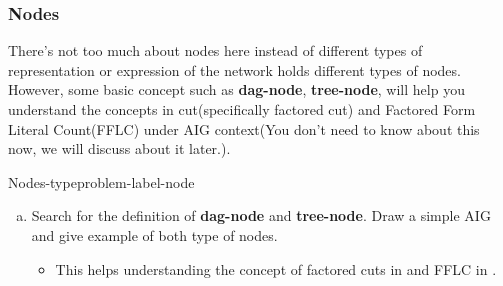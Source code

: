 \documentclass[main.tex]{subfiles}
\begin{document}
\subsubsection{Nodes}
There's not too much about nodes here instead of different types of representation or expression of the network holds different types of nodes. However, some basic concept such as \textbf{dag-node}, \textbf{tree-node}, will help you understand the concepts in cut(specifically factored cut) and Factored Form Literal Count(FFLC) under AIG context(You don't need to know about this now, we will discuss about it later.).
\begin{problem}{Nodes-type}{problem-label-node}
\begin{enumerate}[(a)]
    \item Search for the definition of \textbf{dag-node} and \textbf{tree-node}. Draw a simple AIG and give example of both type of nodes.
    \begin{itemize}
        \item This helps understanding the concept of factored cuts in \cite{FactoredCuts} and FFLC in \cite{FFLC}.
    \end{itemize}
    \end{enumerate}
\end{problem}
\vspace*{4\baselineskip}
\end{document}
